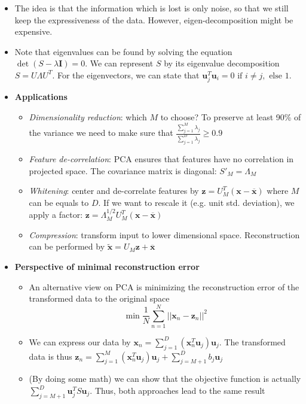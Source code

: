 \begin{itemize}
	\item The idea is that the information which is lost is only noise, so that we still keep the expressiveness of the data. However, eigen-decomposition might be expensive.
	\item Note that eigenvalues can be found by solving the equation $\det\left(S - \lambda \bm{I}\right) = 0$. We can represent $S$ by its eigenvalue decomposition $S=U\Lambda U^T$. For the eigenvectors, we can state that $\bm{u}_j^T \bm{u}_i = 0 \text{ if } i\neq j, \text{ else } 1$.
	\item \textbf{Applications}
	\begin{itemize}
		\item \textit{Dimensionality reduction}: which $M$ to choose? To preserve at least 90\% of the variance we need to make sure that $\frac{\sum_{j=1}^{M}\lambda_j}{\sum_{j=1}^{D}\lambda_j} \geq 0.9$
		\item \textit{Feature de-correlation}: PCA ensures that features have no correlation in projected space. The covariance matrix is diagonal: $S'_M = \Lambda_M$
		\item \textit{Whitening}: center and de-correlate features by $\bm{z} = U_M^T (\bm{x}-\overline{\bm{x}})$ where $M$ can be equals to $D$. If we want to rescale it (e.g. unit std. deviation), we apply a factor: $\bm{z} = \Lambda_M^{1/2} U_M^T (\bm{x}-\overline{\bm{x}})$ 
		\item \textit{Compression}: transform input to lower dimensional space. Reconstruction can be performed by $\tilde{\bm{x}} = U_M \bm{z} + \overline{\bm{x}}$
	\end{itemize}
	\item \textbf{Perspective of minimal reconstruction error}
	\begin{itemize}
		\item An alternative view on PCA is minimizing the reconstruction error of the transformed data to the original space
		$$\min \frac{1}{N} \sum\limits_{n=1}^{N} ||\bm{x}_n - \bm{z}_n||^2$$
		\item We can express our data by $\bm{x}_n = \sum\limits_{j=1}^{D} (\bm{x}_n^T \bm{u}_j) \bm{u}_j$. The transformed data is thus $\bm{z}_n = \sum\limits_{j=1}^{M} (\bm{x}_n^T \bm{u}_j) \bm{u}_j + \sum\limits_{j=M+1}^{D} b_j \bm{u}_j$
		\item (By doing some math) we can show that the objective function is actually $\sum_{j=M+1}^{D} \bm{u}_j^T S \bm{u}_j$. Thus, both approaches lead to the same result
	\end{itemize}
\end{itemize}
